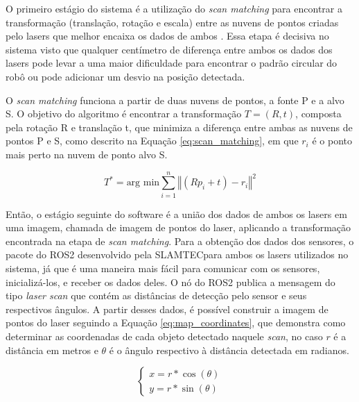 \documentclass[acronym, symbols, table]{fei}
\begin{document}
				O primeiro estágio do sistema é a utilização do \textit{scan matching} para encontrar a transformação (translação, rotação e escala) entre as nuvens de pontos criadas pelo lasers que melhor encaixa os dados de ambos \cite{NIETO200739}. Essa etapa é decisiva no sistema visto que qualquer centímetro de diferença entre ambos os dados dos lasers pode levar a uma maior dificuldade para encontrar o padrão circular do robô ou pode adicionar um desvio na posição detectada.
								
				O \textit{scan matching} funciona a partir de duas nuvens de pontos, a fonte P e a alvo S. O objetivo do algoritmo é encontrar a transformação $T = (R, t)$, composta pela rotação R e translação t, que minimiza a diferença entre ambas as nuvens de pontos P e S, como descrito na Equação \ref{eq:scan_matching}, em que $r_i$ é o ponto mais perto na nuvem de ponto alvo S.
				
				\begin{equation} \label{eq:scan_matching}
					T^* = \text{arg min} \sum_{i=1}^{n}\left\Vert (Rp_i + t) - r_i \right\Vert^2
				\end{equation}
			
				Então, o estágio seguinte do software é a união dos dados de ambos os lasers em uma imagem, chamada de imagem de pontos do laser, aplicando a transformação encontrada na etapa de \textit{scan matching}. Para a obtenção dos dados dos sensores, o pacote do ROS2 desenvolvido pela SLAMTEC\textregistered para ambos os lasers utilizados no sistema, já que é uma maneira mais fácil para comunicar com os sensores, inicializá-los, e receber os dados deles. O nó do ROS2 publica a mensagem do tipo \textit{laser scan} que contém as distâncias de detecção pelo sensor e seus respectivos ângulos. A partir desses dados, é possível construir a imagem de pontos do laser seguindo a Equação \eqref{eq:map_coordinates}, que demonstra como determinar as coordenadas de cada objeto detectado naquele \textit{scan}, no caso $r$ é a distância em metros e $\theta$ é o ângulo respectivo à distância detectada em radianos.
				
				\begin{equation}\label{eq:map_coordinates}
					\begin{cases}
						x = r * \cos(\theta) \\
						y = r * \sin(\theta)
					\end{cases}
				\end{equation}
			
\end{document}
